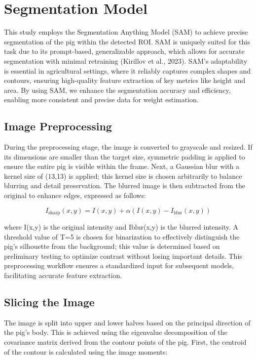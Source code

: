 {\section{Segmentation Model}
This study employs the Segmentation Anything Model (SAM) to achieve precise segmentation of the pig within the detected ROI. SAM is uniquely suited for this task due to its prompt-based, generalizable approach, which allows for accurate segmentation with minimal retraining (Kirillov et al., 2023). SAM’s adaptability is essential in agricultural settings, where it reliably captures complex shapes and contours, ensuring high-quality feature extraction of key metrics like height and area. By using SAM, we enhance the segmentation accuracy and efficiency, enabling more consistent and precise data for weight estimation.
\subsection{Image Preprocessing}
During the preprocessing stage, the image is converted to grayscale and resized. If its dimensions are smaller than the target size, symmetric padding is applied to ensure the entire pig is visible within the frame. Next, a Gaussian blur with a kernel size of (13,13) is applied; this kernel size is chosen arbitrarily to balance blurring and detail preservation. The blurred image is then subtracted from the original to enhance edges, expressed as follows:

\myequation{}
\begin{equation}
	I_{\text{sharp}}(x, y) = I(x, y) + \alpha (I(x, y) - I_{\text{blur}}(x, y))
\end{equation}

where I(x,y) is the original intensity and Iblur(x,y) is the blurred intensity. A threshold value of T=5 is chosen for binarization to effectively distinguish the pig’s silhouette from the background; this value is determined based on preliminary testing to optimize contrast without losing important details. This preprocessing workflow ensures a standardized input for subsequent models, facilitating accurate feature extraction.

\subsection{Slicing the Image}
The image is split into upper and lower halves based on the principal direction of the pig’s body. This is achieved using the eigenvalue decomposition of the covariance matrix derived from the contour points of the pig. First, the centroid of the contour is calculated using the image moments:

}
